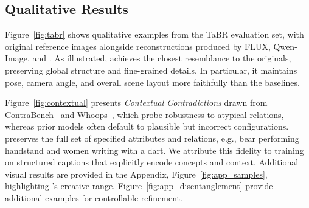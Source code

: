 
\subsection{Qualitative Results}
\label{sec:Qualitative_Results}


Figure~\ref{fig:tabr} shows qualitative examples from the TaBR evaluation set, with original reference images alongside reconstructions produced by FLUX, Qwen-Image, and \modelname{}. As illustrated, \modelname{} achieves the closest resemblance to the originals, preserving global structure and fine-grained details. In particular, it maintains pose, camera angle, and overall scene layout more faithfully than the baselines.

Figure~\ref{fig:contextual} presents \textit{Contextual Contradictions} drawn from ContraBench~\cite{huberman2025image} and Whoops~\cite{Bitton_Guetta_2023}, which probe robustness to atypical relations, whereas prior models often default to plausible but incorrect configurations. \modelname{} preserves the full set of specified attributes and relations, e.g., bear performing handstand and women writing with a dart. We attribute this fidelity to training on structured captions that explicitly encode concepts and context. Additional visual results are provided in the Appendix, Figure~\ref{fig:app_samples}, highlighting \modelname{}’s creative range. Figure~\ref{fig:app_disentanglement} provide additional examples for controllable refinement.








